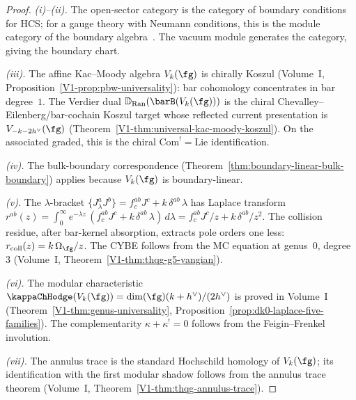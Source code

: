 \begin{proof}
\emph{(i)--(ii).}
The open-sector category is the category of boundary
conditions for HCS; for a gauge theory with Neumann
conditions, this is the module category of the boundary
algebra~\cite{costello-gaiotto}. The vacuum module generates
the category, giving the boundary chart.

\emph{(iii).}
The affine Kac--Moody algebra $V_k(\fg)$ is chirally Koszul
(Volume~I, Proposition~\ref*{V1-prop:pbw-universality}): bar cohomology
concentrates in bar degree~$1$. The Verdier dual
$\mathbb{D}_{\mathrm{Ran}}(\barB(V_k(\fg)))$ is the chiral
Chevalley--Eilenberg/bar-cochain Koszul target whose reflected current
presentation is $V_{-k-2h^\vee}(\fg)$
(Theorem~\ref*{V1-thm:universal-kac-moody-koszul}). On the
associated graded, this is the chiral
$\mathrm{Com}^! = \mathrm{Lie}$ identification.

\emph{(iv).}
The bulk-boundary correspondence
(Theorem~\ref{thm:boundary-linear-bulk-boundary})
applies because $V_k(\fg)$ is boundary-linear.

\emph{(v).}
The $\lambda$-bracket
$\{J^a_\lambda J^b\} = f^{ab}_c J^c + k\, \delta^{ab}\, \lambda$
has Laplace transform
$r^{ab}(z) = \int_0^\infty e^{-\lambda z}\,
(f^{ab}_c J^c + k\, \delta^{ab}\, \lambda)\, d\lambda
= f^{ab}_c J^c / z + k\, \delta^{ab} / z^2$.
The collision residue, after bar-kernel absorption,
extracts pole orders one less: $r_{\mathrm{coll}}(z)
= k\,\Omega_\fg / z$. The CYBE follows from the MC equation at
genus~$0$, degree~$3$
(Volume~I, Theorem~\ref*{V1-thm:thqg-g5-yangian}).

\emph{(vi).}
The modular characteristic
$\kappaChHodge(V_k(\fg)) = \dim(\fg)(k + h^\vee)/(2h^\vee)$
is proved in Volume~I
(Theorem~\ref*{V1-thm:genus-universality},
Proposition~\ref{prop:dk0-laplace-five-families}).
The complementarity $\kappa + \kappa^! = 0$ follows from
the Feigin--Frenkel involution.

\emph{(vii).}
The annulus trace is the standard Hochschild homology of
$V_k(\fg)$; its identification with the first modular shadow
follows from the annulus trace theorem
(Volume~I, Theorem~\ref*{V1-thm:thqg-annulus-trace}).
\end{proof}

